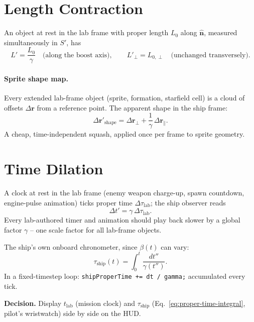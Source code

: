 \documentclass[11pt]{article}
\newcommand{\vb}[1]{\mathbf{#1}}
\newcommand{\uv}[1]{\hat{\mathbf{#1}}}
\newcommand{\pperp}{{\perp}}
\newcommand{\ppar}{{\parallel}}
\newcommand{\decision}[1]{\par\smallskip\noindent\textbf{Decision.} #1\par\smallskip}
\begin{document}
\section{Length Contraction}
\label{sec:contraction}

An object at rest in the lab frame with proper length $L_0$ along $\uv n$, measured simultaneously in $S'$, has
\begin{equation}
  L' = \frac{L_0}{\gamma} \quad\text{(along the boost axis)}, \qquad L'_\pperp = L_{0,\pperp} \quad\text{(unchanged transversely)}.
\end{equation}

\paragraph{Sprite shape map.} Every extended lab-frame object (sprite, formation, starfield cell) is a cloud of offsets $\Delta\vb r$ from a reference point. The apparent shape in the ship frame:
\begin{equation}
  \Delta\vb r'_{\text{shape}} = \Delta\vb r_\pperp + \frac{1}{\gamma}\,\Delta\vb r_\ppar. \label{eq:shape-map}
\end{equation}
A cheap, time-independent squash, applied once per frame to sprite geometry.

\section{Time Dilation}
\label{sec:dilation}

A clock at rest in the lab frame (enemy weapon charge-up, spawn countdown, engine-pulse animation) ticks proper time $\Delta\tau_{\text{lab}}$; the ship observer reads
\begin{equation}
  \Delta t' = \gamma\, \Delta\tau_{\text{lab}}.
\end{equation}
Every lab-authored timer and animation should play back slower by a global factor $\gamma$ -- one scale factor for all lab-frame objects.

The ship's own onboard chronometer, since $\beta(t)$ can vary:
\begin{equation}
  \tau_{\text{ship}}(t) = \int_0^{t} \frac{dt''}{\gamma(t'')}.
  \label{eq:proper-time-integral}
\end{equation}
In a fixed-timestep loop: \texttt{shipProperTime += dt / gamma;} accumulated every tick.

\decision{Display $t_{\text{lab}}$ (mission clock) and $\tau_{\text{ship}}$ (Eq.~\eqref{eq:proper-time-integral}, pilot's wristwatch) side by side on the HUD.}
\end{document}
